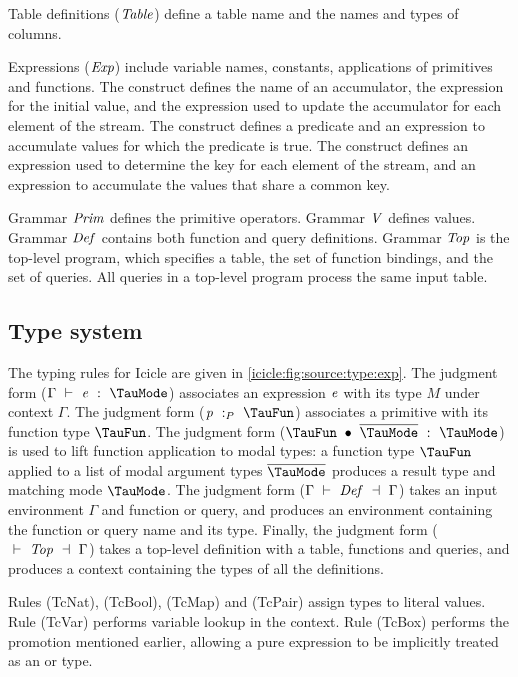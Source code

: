Table definitions ($\mathit{Table}$) define a table name and the names and types of columns.

Expressions ($\mathit{Exp}$) include variable names, constants, applications of primitives and functions.
The \Ic@fold@ construct defines the name of an accumulator, the expression for the initial value, and the expression used to update the accumulator for each element of the stream.
The \Ic@filter@ construct defines a predicate and an expression to accumulate values for which the predicate is true.
The \Ic@group@ construct defines an expression used to determine the key for each element of the stream, and an expression to accumulate the values that share a common key.

Grammar $\mathit{Prim}$ defines the primitive operators.
Grammar $\mathit{V}$ defines values.
Grammar $\mathit{Def}$ contains both function and query definitions.
Grammar $\mathit{Top}$ is the top-level program, which specifies a table, the set of function bindings, and the set of queries.
All queries in a top-level program process the same input table.


\subsection{Type system}
\label{icicle:s:ElementsAndAggregates:TypeSystem}

The typing rules for Icicle are given in \cref{icicle:fig:source:type:exp}.
The judgment form ($\Typecheck{\Gamma}{\mi{e}}{\TauMode}$) associates an expression $\mathit{e}$ with its type $M$ under context $\Gamma$.
The judgment form ($\TypecheckP{\mi{p}}{\TauFun}$) associates a primitive with its function type $\TauFun$.
The judgment form ($\TypecheckApp{\TauFun}{\ov{\TauMode}}{\TauMode}$) is used to lift function application to modal types: a function type $\TauFun$ applied to a list of modal argument types $\ov{\TauMode}$ produces a result type and matching mode $\TauMode$.
The judgment form ($\TypecheckS{\Gamma}{\mi{Def}}{\Gamma}$) takes an input environment $\Gamma$ and function or query, and produces an environment containing the function or query name and its type.
Finally, the judgment form ($\TypecheckS{}{\mi{Top}}{\Gamma}$) takes a top-level definition with a table, functions and queries, and produces a context containing the types of all the definitions.




Rules (TcNat), (TcBool), (TcMap) and (TcPair) assign types to literal values.
Rule (TcVar) performs variable lookup in the context.
Rule (TcBox) performs the promotion mentioned earlier, allowing a pure expression to be implicitly treated as an \Ic@Element@ or \Ic@Aggregate@ type. 

